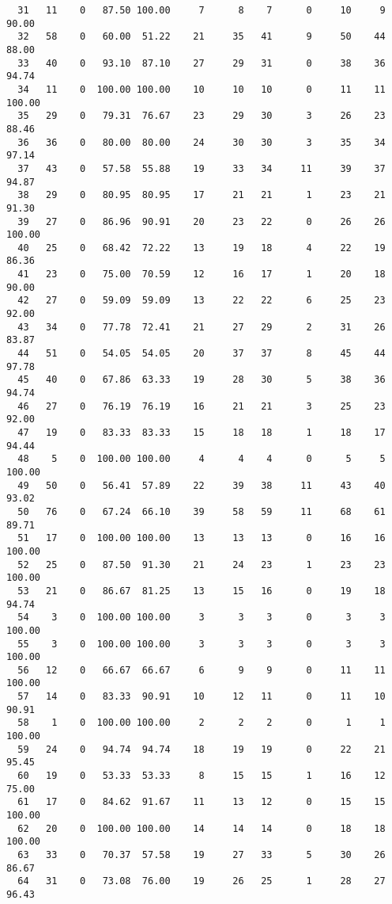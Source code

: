 \begin{verbatim}
  31   11    0   87.50 100.00     7      8    7      0     10     9    90.00
  32   58    0   60.00  51.22    21     35   41      9     50    44    88.00
  33   40    0   93.10  87.10    27     29   31      0     38    36    94.74
  34   11    0  100.00 100.00    10     10   10      0     11    11   100.00
  35   29    0   79.31  76.67    23     29   30      3     26    23    88.46
  36   36    0   80.00  80.00    24     30   30      3     35    34    97.14
  37   43    0   57.58  55.88    19     33   34     11     39    37    94.87
  38   29    0   80.95  80.95    17     21   21      1     23    21    91.30
  39   27    0   86.96  90.91    20     23   22      0     26    26   100.00
  40   25    0   68.42  72.22    13     19   18      4     22    19    86.36
  41   23    0   75.00  70.59    12     16   17      1     20    18    90.00
  42   27    0   59.09  59.09    13     22   22      6     25    23    92.00
  43   34    0   77.78  72.41    21     27   29      2     31    26    83.87
  44   51    0   54.05  54.05    20     37   37      8     45    44    97.78
  45   40    0   67.86  63.33    19     28   30      5     38    36    94.74
  46   27    0   76.19  76.19    16     21   21      3     25    23    92.00
  47   19    0   83.33  83.33    15     18   18      1     18    17    94.44
  48    5    0  100.00 100.00     4      4    4      0      5     5   100.00
  49   50    0   56.41  57.89    22     39   38     11     43    40    93.02
  50   76    0   67.24  66.10    39     58   59     11     68    61    89.71
  51   17    0  100.00 100.00    13     13   13      0     16    16   100.00
  52   25    0   87.50  91.30    21     24   23      1     23    23   100.00
  53   21    0   86.67  81.25    13     15   16      0     19    18    94.74
  54    3    0  100.00 100.00     3      3    3      0      3     3   100.00
  55    3    0  100.00 100.00     3      3    3      0      3     3   100.00
  56   12    0   66.67  66.67     6      9    9      0     11    11   100.00
  57   14    0   83.33  90.91    10     12   11      0     11    10    90.91
  58    1    0  100.00 100.00     2      2    2      0      1     1   100.00
  59   24    0   94.74  94.74    18     19   19      0     22    21    95.45
  60   19    0   53.33  53.33     8     15   15      1     16    12    75.00
  61   17    0   84.62  91.67    11     13   12      0     15    15   100.00
  62   20    0  100.00 100.00    14     14   14      0     18    18   100.00
  63   33    0   70.37  57.58    19     27   33      5     30    26    86.67
  64   31    0   73.08  76.00    19     26   25      1     28    27    96.43

\end{verbatim}
